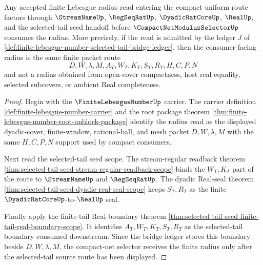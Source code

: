 \begin{theorem}
\label{thm:finite-lebesgue-number-selected-tail-radius-admission}
Any accepted finite Lebesgue radius read entering the compact-uniform route factors through $\StreamNameUp$, $\RegSeqRatUp$, $\DyadicRatCoreUp$, $\RealUp$, and the selected-tail seed handoff before $\CompactNetModulusSelectorUp$ consumes the radius. More precisely, if the read is admitted by the ledger $J$ of \autoref{def:finite-lebesgue-number-selected-tail-bridge-ledger}, then the consumer-facing radius is the same finite packet route
$$
D,W,\lambda,M,A_T,W_T,K_T,S_T,R_T,H,C,P,N
$$
and not a radius obtained from open-cover compactness, host real equality, selected subcovers, or ambient Real completeness.
\end{theorem}
\begin{proof}
Begin with the $\FiniteLebesgueNumberUp$ carrier. The carrier definition \autoref{def:finite-lebesgue-number-carrier} and the root package theorem \autoref{thm:finite-lebesgue-number-root-unblock-package} identify the radius read as the displayed dyadic-cover, finite-window, rational-ball, and mesh packet $D,W,\lambda,M$ with the same $H,C,P,N$ support used by compact consumers.

Next read the selected-tail seed scope. The stream-regular readback theorem \autoref{thm:selected-tail-seed-stream-regular-readback-scope} binds the $W_T,K_T$ part of the route to $\StreamNameUp$ and $\RegSeqRatUp$. The dyadic Real-seal theorem \autoref{thm:selected-tail-seed-dyadic-real-seal-scope} keeps $S_T,R_T$ as the finite $\DyadicRatCoreUp$-to-$\RealUp$ seal.

Finally apply the finite-tail Real-boundary theorem \autoref{thm:selected-tail-seed-finite-tail-real-boundary-scope}. It identifies $A_T,W_T,K_T,S_T,R_T$ as the selected-tail boundary consumed downstream. Since the bridge ledger stores this boundary beside $D,W,\lambda,M$, the compact-net selector receives the finite radius only after the selected-tail source route has been displayed.
\end{proof}

